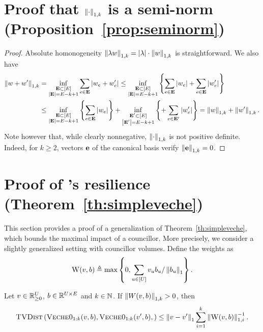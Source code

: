 \section{Proof that $\left\lVert{\cdot}\right\rVert_{1,k}$ is a semi-norm (Proposition~\ref{prop:seminorm})}
\label{app:seminorm}

\begin{proof}
    Absolute homonogeneity 
    $\left\lVert{\lambda w}\right\rVert_{1, k} = \left\lvert{\lambda}\right\rvert \cdot \left\lVert{w}\right\rVert_{1,k}$
    is straightforward.
    We also have
    \begin{align*}
        \left\lVert{w + w'}\right\rVert_{1,k}
        &= \inf_{\substack{{\bf E} \subset [E] \\ \left\lvert{{\bf E}}\right\rvert = E - k + 1}}
            \sum_{e \in {\bf E}} \left\lvert{w_e + w_e'}\right\rvert 
        \leq \inf_{\substack{{\bf E} \subset [E] \\ \left\lvert{{\bf E}}\right\rvert = E - k + 1}} \left\lbrace 
            \sum_{e \in {\bf E}} \left\lvert{w_e}\right\rvert 
            + \sum_{e \in {\bf E}} \left\lvert{w_e'}\right\rvert 
         \right\rbrace \\
        &\leq \inf_{\substack{{\bf E} \subset [E] \\ \left\lvert{{\bf E}}\right\rvert = E - k + 1}} \left\lbrace 
            \sum_{e \in {\bf E}} \left\lvert{w_e}\right\rvert
         \right\rbrace + \inf_{\substack{{\bf E}' \subset [E] \\ \left\lvert{{\bf E}'}\right\rvert = E - k + 1}} \left\lbrace 
            + \sum_{e \in {\bf E}'} \left\lvert{w_e'}\right\rvert 
         \right\rbrace 
        = \left\lVert{w}\right\rVert_{1,k} + \left\lVert{w'}\right\rVert_{1,k}.
    \end{align*}
    Note however that, while clearly nonnegative,
    $\left\lVert{\cdot}\right\rVert_{1,k}$ is not positive definite.
    Indeed, for $k \geq 2$, vectors ${\bf e}$ of the canonical basis 
    verify $\left\lVert{\bf e}\right\rVert_{1,k} = 0$.
\end{proof}


\section{Proof of \SimpleVeche{}'s resilience (Theorem~\ref{th:simpleveche})}
\label{app:simpleveche}

This section provides a proof of a generalization of Theorem~\ref{th:simpleveche},
which bounds the maximal impact of a councillor.
More precisely, we consider a slightly generalized setting with councillor volumes.
Define the weights as
\begin{align}
    \textsc{W}(v, b) 
    \triangleq \max \left\lbrace 0, \sum_{u \in [U]} v_u b_u / \left\lVert{b_u}\right\rVert_{1} \right\rbrace.
\end{align}

\begin{theorem}
\label{th:lipschitz_simpleveche}
    Let $v \in \mathbb R_{\geq 0}^U$, $b \in \mathbb R^{U \times E}$ and $k \in \mathbb N$.
    If $\left\lVert{W(v, b)}\right\rVert_{1, k} > 0$, then
    \begin{align}
        \textsc{TVDist} \left(
            \textsc{Veche0}_{1:k} (v, b),
            \textsc{Veche0}_{1:k} (v', b),
        \right)
        \leq \left\lVert{v - v'}\right\rVert_{1} 
            \sum_{i=1}^k \left\lVert{\textsc{W}(v, b)}\right\rVert_{1, i}^{-1}.
    \end{align}
\end{theorem}


